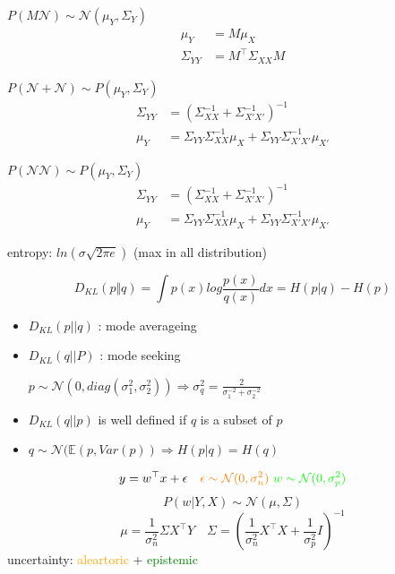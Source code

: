 \documentclass[landscape,a0paper,fontscale=0.285]{baposter} %
\newcommand{\compresslist}{ %
\setlength{\itemsep}{1pt}
\setlength{\parskip}{0pt}
\setlength{\parsep}{0pt}
}
\begin{document}
\begin{poster}
{$P(M \mathcal N)\sim \mathcal N(\mu_Y, \Sigma_Y)$
\vspace{-0.3cm}
$$
\begin{aligned}
\mu_Y &= M\mu_X\\
\Sigma_{YY} &= M^\top\Sigma_{XX}M
\end{aligned}
$$

$P(\mathcal N + \mathcal N) \sim P(\mu_{Y}, \Sigma_Y)$
\vspace{-0.3cm}
$$
\begin{aligned}
\Sigma_{YY}&= (\Sigma_{XX}^{-1}+\Sigma_{X'X'}^{-1})^{-1}
\\
\mu_{Y} &= \Sigma_{YY}\Sigma_{XX}^{-1}\mu_X + \Sigma_{YY}\Sigma_{X'X'}^{-1}\mu_{X'}
\end{aligned}
$$

$P(\mathcal N \mathcal N) \sim P(\mu_{Y}, \Sigma_Y)$
\vspace{-0.3cm}
$$
\begin{aligned}
\Sigma_{YY}&= (\Sigma_{XX}^{-1}+\Sigma_{X'X'}^{-1})^{-1}
\\
\mu_{Y} &= \Sigma_{YY}\Sigma_{XX}^{-1}\mu_X + \Sigma_{YY}\Sigma_{X'X'}^{-1}\mu_{X'}
\end{aligned}
$$

entropy: $ln(\sigma\sqrt{2\pi e})$ (max in all distribution)

\colorbox[HTML]{CCFFFF}{} 
\vspace{-0.3cm}
$$
D_{KL}(p\Vert q) = \int  p(x)log\frac{p(x)}{q(x)}dx = H(p\vert q) - H(p)
$$
\begin{itemize}\compresslist
    \item $D_{KL}(p||q)$ : mode averageing
    \item $D_{KL}(q||P)$ : mode seeking
    
    $p\sim\mathcal N(0,diag(\sigma_1^2,\sigma_2^2))\Rightarrow\sigma_q^2 = \frac{2}{\sigma_1^{-2}+\sigma_2^{-2}}$
    \item $D_{KL}(q||p)$ is well defined if $q$ is a subset of $p$
    \item $q\sim \mathcal N(\mathbb E(p,Var(p)) \Rightarrow H(p\vert q)=H(q)$
\end{itemize}


\colorbox[HTML]{CCFFFF}{}
\vspace{-0.3cm}
$$
y = w^\top x + \epsilon\quad 
\textcolor{orange}{\epsilon\sim \mathcal N(0,\sigma_n^2)}
~
\textcolor{green}{w\sim\mathcal N(0,\sigma_p^2)}
$$
$$
P(w|Y,X) \sim \mathcal N(\mu,\Sigma)
$$
$$
\mu = \frac{1}{\sigma_n^2}\Sigma X^\top Y \quad
\Sigma = \left(\frac{1}{\sigma_n^2}X^\top X + \frac{1}{\sigma_p^2}I\right)^{-1}
$$
uncertainty: \textcolor{orange}{aleartoric} + \textcolor{green}{epistemic}

}
\end{poster}
\end{document}
